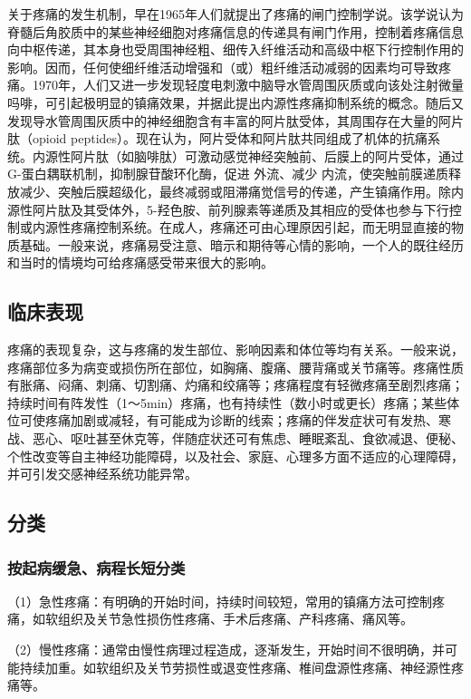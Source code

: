 关于疼痛的发生机制，早在1965年人们就提出了疼痛的闸门控制学说。该学说认为脊髓后角胶质中的某些神经细胞对疼痛信息的传递具有闸门作用，控制着疼痛信息向中枢传递，其本身也受周围神经粗、细传入纤维活动和高级中枢下行控制作用的影响。因而，任何使细纤维活动增强和（或）粗纤维活动减弱的因素均可导致疼痛。1970年，人们又进一步发现轻度电刺激中脑导水管周围灰质或向该处注射微量吗啡，可引起极明显的镇痛效果，并据此提出内源性疼痛抑制系统的概念。随后又发现导水管周围灰质中的神经细胞含有丰富的阿片肽受体，其周围存在大量的阿片肽（opioid
peptides）。现在认为，阿片受体和阿片肽共同组成了机体的抗痛系统。内源性阿片肽（如脑啡肽）可激动感觉神经突触前、后膜上的阿片受体，通过G-蛋白耦联机制，抑制腺苷酸环化酶，促进
外流、减少
内流，使突触前膜递质释放减少、突触后膜超级化，最终减弱或阻滞痛觉信号的传递，产生镇痛作用。除内源性阿片肽及其受体外，5-羟色胺、前列腺素等递质及其相应的受体也参与下行控制或内源性疼痛控制系统。在成人，疼痛还可由心理原因引起，而无明显直接的物质基础。一般来说，疼痛易受注意、暗示和期待等心情的影响，一个人的既往经历和当时的情境均可给疼痛感受带来很大的影响。

\subsection{临床表现}

疼痛的表现复杂，这与疼痛的发生部位、影响因素和体位等均有关系。一般来说，疼痛部位多为病变或损伤所在部位，如胸痛、腹痛、腰背痛或关节痛等。疼痛性质有胀痛、闷痛、刺痛、切割痛、灼痛和绞痛等；疼痛程度有轻微疼痛至剧烈疼痛；持续时间有阵发性（1～5min）疼痛，也有持续性（数小时或更长）疼痛；某些体位可使疼痛加剧或减轻，有可能成为诊断的线索；疼痛的伴发症状可有发热、寒战、恶心、呕吐甚至休克等，伴随症状还可有焦虑、睡眠紊乱、食欲减退、便秘、个性改变等自主神经功能障碍，以及社会、家庭、心理多方面不适应的心理障碍，并可引发交感神经系统功能异常。

\subsection{分类}

\subsubsection{按起病缓急、病程长短分类}

（1）急性疼痛：有明确的开始时间，持续时间较短，常用的镇痛方法可控制疼痛，如软组织及关节急性损伤性疼痛、手术后疼痛、产科疼痛、痛风等。

（2）慢性疼痛：通常由慢性病理过程造成，逐渐发生，开始时间不很明确，并可能持续加重。如软组织及关节劳损性或退变性疼痛、椎间盘源性疼痛、神经源性疼痛等。

